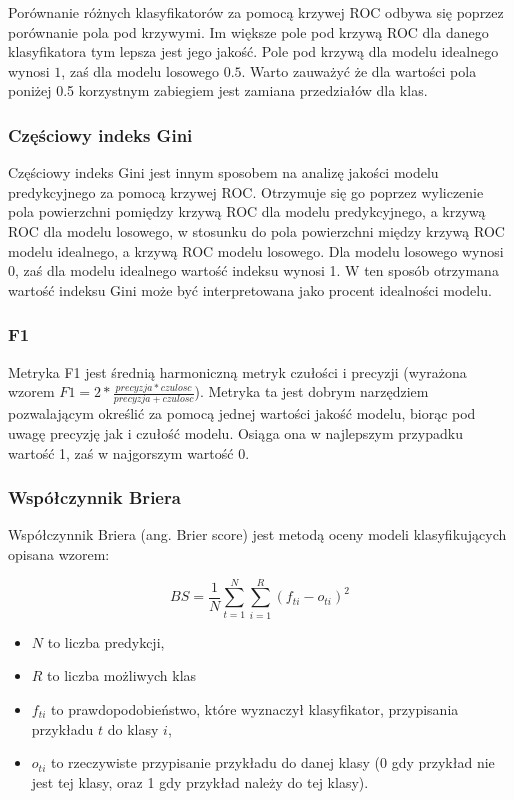 \documentclass[a4paper, twoside, 11pt, openright]{article}
\begin{document}
Porównanie różnych klasyfikatorów za pomocą krzywej ROC odbywa się poprzez porównanie pola pod krzywymi. Im większe pole pod krzywą ROC dla danego klasyfikatora tym lepsza jest jego jakość. Pole pod krzywą dla modelu idealnego wynosi $1$, zaś dla modelu losowego $0.5$. Warto zauważyć że dla wartości pola poniżej 0.5  korzystnym zabiegiem jest zamiana przedziałów dla klas.


\subsubsection{Częściowy indeks Gini} %

Częściowy indeks Gini jest innym sposobem na analizę jakości modelu predykcyjnego za pomocą krzywej ROC. Otrzymuje się go poprzez wyliczenie pola powierzchni pomiędzy krzywą ROC dla modelu predykcyjnego, a krzywą ROC dla modelu losowego, w stosunku do pola powierzchni między krzywą ROC modelu idealnego, a krzywą ROC modelu losowego. Dla modelu losowego wynosi 0, zaś dla modelu idealnego wartość indeksu wynosi 1. W ten sposób otrzymana wartość indeksu Gini może być interpretowana jako procent idealności modelu.

\subsubsection{F1} %

Metryka F1 jest średnią harmoniczną metryk czułości i precyzji (wyrażona wzorem $F1=2*\frac{precyzja*czulosc}{precyzja+czulosc}$). Metryka ta jest dobrym narzędziem pozwalającym określić za pomocą jednej wartości jakość modelu, biorąc pod uwagę precyzję jak i czułość modelu. Osiąga ona w najlepszym przypadku wartość 1, zaś w najgorszym wartość 0. 

\subsubsection{Współczynnik Briera}

Współczynnik Briera (ang. Brier score)\cite{brier} jest metodą oceny modeli klasyfikujących opisana wzorem:

$$	BS=\frac{1}{N} \sum_{t=1}^{N} \sum_{i=1}^{R}(f_{ti}-o_{ti})^2 $$

\begin{itemize}
\item $N$ to liczba predykcji,
\item $R$  to liczba możliwych klas
\item $f_{ti}$ to prawdopodobieństwo, które wyznaczył klasyfikator, przypisania przykładu $t$ do klasy $i$,
\item $o_{ti}$ to rzeczywiste przypisanie przykładu do danej klasy (0 gdy przykład nie jest tej klasy, oraz 1 gdy przykład należy do tej klasy).
\end{itemize}
\end{document}
